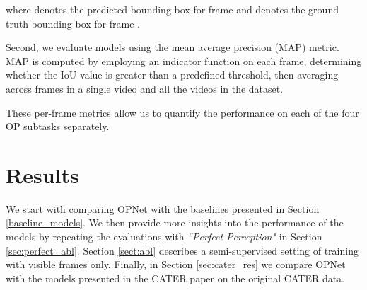 \documentclass[]{llncs}
\newcommand{\secref}[1]{Section \ref{#1}}
\begin{document}
where  denotes the predicted bounding box for frame  and  denotes the ground truth bounding box for frame .

Second, we evaluate models using the mean average precision (MAP) metric. MAP is computed by employing an indicator function on each frame, determining whether the IoU value is greater than a predefined threshold, then averaging across frames in a single video and all the videos in the dataset.


These per-frame metrics allow us to quantify the performance on each of the four OP subtasks separately.
 
\section{Results} 
\label{sec:Results}
We start with comparing OPNet with the baselines presented in  \secref{baseline_models}. We then provide more insights into the performance of the models by repeating the evaluations with \textit{``Perfect Perception"} in  \secref{sec:perfect_abl}.  \secref{sect:abl} describes a semi-supervised setting of training with visible frames only. Finally, in \secref{sec:cater_res} we compare OPNet with the models presented in the CATER paper on the original CATER data.
\end{document}

